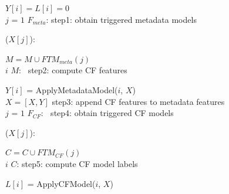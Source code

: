 \begin{algorithm*}[t!]
  \quad\quad\qquad $Y[i] = L[i] = 0$\\

  
  \quad\quad {} $j$ = $1$  $F_{meta}$:
  \qquad \codecomment step1: obtain triggered metadata models

  \quad\quad\qquad {} ($X[j]$):
  
  \quad\quad\qquad\qquad $M = M \cup FTM_{meta}(j)$\\

  \quad\quad {} $i$  $M$: \qquad\qquad\quad\thinspace$\,$
  \codecomment step2: compute CF features
  
  \quad\quad\qquad $Y[i]$ = ApplyMetadataModel($i$, $X$)\\
  
  \quad\quad $X = [X, Y]$ \qquad\qquad \thinspace\thinspace\thinspace\thinspace\thinspace\thinspace\thinspace\thinspace \codecomment step3: append CF features to
  metadata features\\

  \quad\quad {} $j$ = $1$  $F_{CF}$:
  \qquad\thinspace$\>$ \codecomment step4: obtain triggered CF models

  \quad\quad\qquad {} ($X[j]$):

  \quad\quad\qquad\qquad $C = C \cup FTM_{CF}(j)$\\  
  
  \quad\quad {} $i$  $C$: \qquad\qquad\quad\enspace\enspace
  \codecomment step5: compute CF model labels
  
  \quad\quad\qquad$L[i]$ = ApplyCFModel($i$, $X$)\\
  
\end{algorithm*}


